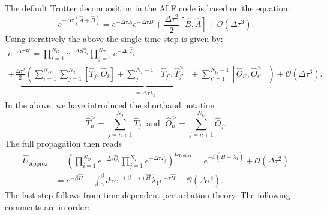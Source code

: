 The default Trotter decomposition in the ALF code is  based on the equation: 
\begin{equation}
	e^{ -\Delta \tau \left( \hat{A} + \hat{B} \right)  }  =  e^{ -\Delta \tau \hat{A}}  e^{ -\Delta \tau  \hat{B}  }   +  \frac{\Delta  \tau^2}{2} \left[ \hat{B}, \hat{A} \right] + \mathcal{O} \left (\Delta \tau ^3 \right).
\end{equation}
Using iteratively the above  the single time step is given by: 
\begin{multline}
    e^{-\Delta \tau \mathcal{H}}   =   \prod_{i=1}^{N_O} e^{-\Delta \tau \hat{O}_i} \prod_{j=1}^{N_T} e^{-\Delta \tau \hat{T}_j}   \\
    + \underbrace{ \frac{\Delta \tau^2}{2}  
   \left(    \sum_{i=1}^{N_O}  \sum_{j=1}^{N_T} \left[ \hat{T}_j, \hat{O}_i \right]  +   \sum_{j'}^{N_T -1}  \left[ \hat{T}_{j'},   \hat{T}_{j'}^{>}\right] 
   +   \sum_{i'=1}^{N_O-1}  \left[ \hat{O}_{i'}, \hat{O}^{>}_{i'} \right]  \right)  }_{\equiv \Delta \tau \hat{\lambda}_1} 
   + \mathcal{O} \left( \Delta \tau^3 \right).
\end{multline}
In the above, we have introduced the shorthand notation 
\begin{equation}
\hat{T}_{n}^{>} = \sum_{j=n+1}^{N_T}  \hat{T}_{j} \; \text{ and } \; \hat{O}_{n}^{>} = \sum_{j=n+1}^{N_O}  \hat{O}_{j}.
\end{equation} 
The full propagation then reads
\begin{equation}
\begin{split}
  \hat{U}_{\text{Approx}} &=  \left(\prod_{i=1}^{N_O} e^{-\Delta \tau \hat{O}_i} \prod_{j=1}^{N_T} e^{-\Delta \tau \hat{T}_j}  \right)^{\!\!L_\text{Trotter}} \!  = e^{-\beta \left(  \hat{H} + \hat{\lambda}_1 \right)} 
  + \mathcal{O} \left( \Delta \tau^2 \right)  \\
  &=  e^{-\beta  \hat{H}  }  - 
	 \int_0^{\beta}  d \tau  e^{-(\beta-\tau )\hat{H}} \hat{\lambda}_1  e^{-\tau \hat{H}}   +  \mathcal{O} (\Delta \tau^2 ).
\end{split}
\end{equation} 
The last step follows from time-dependent perturbation theory. 
The following comments are in order:
